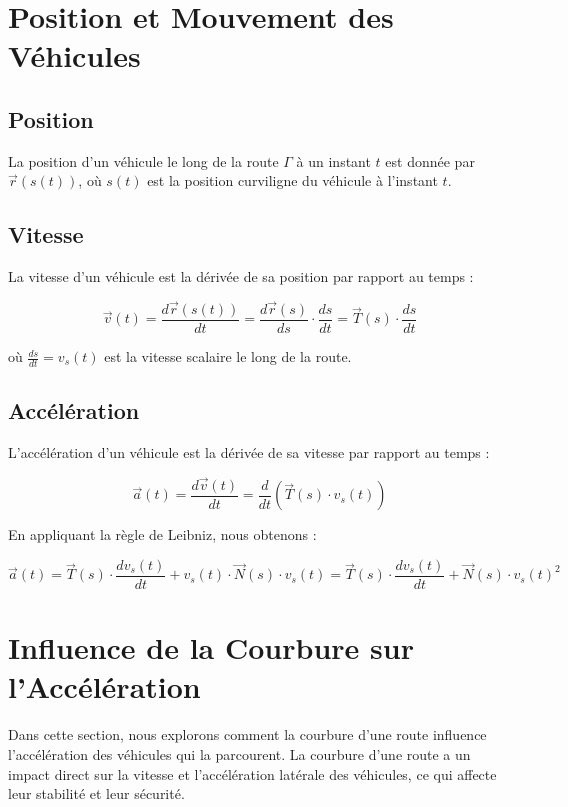 \documentclass[a4paper,12pt]{article}
\begin{document}
\section{Position et Mouvement des Véhicules}

\subsection{Position}

La position d'un véhicule le long de la route \(\Gamma\) à un instant \(t\) est donnée par \(\vec{r}(s(t))\), où \(s(t)\) est la position curviligne du véhicule à l'instant \(t\).

\subsection{Vitesse}

La vitesse d'un véhicule est la dérivée de sa position par rapport au temps :

\[
\vec{v}(t) = \frac{d\vec{r}(s(t))}{dt} = \frac{d\vec{r}(s)}{ds} \cdot \frac{ds}{dt} = \vec{T}(s) \cdot \frac{ds}{dt}
\]

où \(\frac{ds}{dt} = v_s(t)\) est la vitesse scalaire le long de la route.

\subsection{Accélération}

L'accélération d'un véhicule est la dérivée de sa vitesse par rapport au temps :

\[
\vec{a}(t) = \frac{d\vec{v}(t)}{dt} = \frac{d}{dt} \left( \vec{T}(s) \cdot v_s(t) \right)
\]

En appliquant la règle de Leibniz, nous obtenons :

\[
\vec{a}(t) = \vec{T}(s) \cdot \frac{dv_s(t)}{dt} + v_s(t) \cdot \vec{N}(s) \cdot v_s(t) = \vec{T}(s) \cdot \frac{dv_s(t)}{dt} + \vec{N}(s) \cdot v_s(t)^2
\]

\section{Influence de la Courbure sur l'Accélération}

Dans cette section, nous explorons comment la courbure d'une route influence l'accélération des véhicules qui la parcourent. La courbure d'une route a un impact direct sur la vitesse et l'accélération latérale des véhicules, ce qui affecte leur stabilité et leur sécurité.
\end{document}
